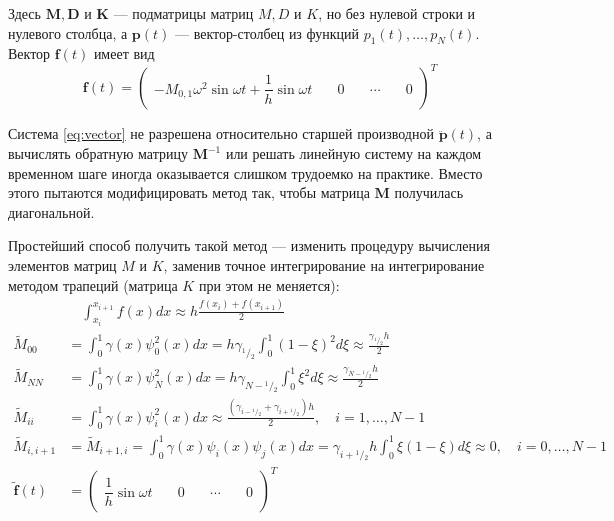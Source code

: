 \documentclass[12pt]{article}
\newcommand{\cutefrac}[2]{{}^{#1\!}\!/{\!}_#2}
\newcommand{\half}{\cutefrac{1}{2}}
\begin{document}
Здесь $\mathbf{M}, \mathbf{D}$ и $\mathbf{K}$ --- подматрицы матриц $M, D$ и
$K$, но без нулевой строки и нулевого столбца, а $\mathbf{p}(t)$ --- вектор-столбец из 
функций $p_1(t), \dots, p_N(t)$. Вектор $\mathbf{f}(t)$ имеет вид
\[
\mathbf{f}(t) = 
\begin{pmatrix}
-M_{0,1}\omega^2 \sin \omega t + \dfrac{1}{h} \sin \omega t & \quad 0 \quad & \cdots & \quad 0
\end{pmatrix}^T
\]

Система \eqref{eq:vector} не разрешена относительно старшей производной
$\ddot{\mathbf{p}}(t)$, а вычислять обратную матрицу $\mathbf{M}^{-1}$ или
решать линейную систему на каждом временном шаге иногда оказывается слишком трудоемко
на практике. Вместо этого пытаются модифицировать метод так, чтобы матрица
$\mathbf{M}$ получилась диагональной.

Простейший способ получить такой метод --- изменить процедуру вычисления
элементов матриц $M$ и $K$, заменив точное интегрирование на интегрирование
методом трапеций (матрица $K$ при этом не меняется):
\begin{align*}
&\quad\int_{x_i}^{x_{i+1}} f(x) dx \approx h\frac{f(x_i) + f(x_{i+1})}{2}\\
\widetilde{M}_{00} &= \int_0^1 \gamma(x) \psi_0^2(x) dx 
= h \gamma_{\half} \int_0^1 (1-\xi)^2 d\xi \approx
\frac{\gamma_{\half}h}{2}\\
\widetilde{M}_{NN} &= \int_0^1 \gamma(x) \psi_N^2(x) dx
= h \gamma_{N - \half} \int_0^1 \xi^2 d\xi \approx
\frac{\gamma_{N - \half}h}{2}\\
\widetilde{M}_{ii} &= \int_0^1 \gamma(x) \psi_i^2(x) dx \approx 
\frac{(\gamma_{i-\half} + \gamma_{i+\half})h}{2}, \quad i=1, \dots,N-1\\
\widetilde{M}_{i,i+1} &= \widetilde{M}_{i+1,i} = \int_0^1 \gamma(x) \psi_i(x) \psi_j(x) dx
= \gamma_{i+\half} h \int_0^1 \xi(1-\xi) d\xi \approx 0, \quad i=0, \dots,N-1\\
\widetilde{\mathbf{f}}(t) &= 
\begin{pmatrix}
\dfrac{1}{h} \sin \omega t & \quad 0 \quad & \cdots & \quad 0
\end{pmatrix}^T
\end{align*}
\end{document}
